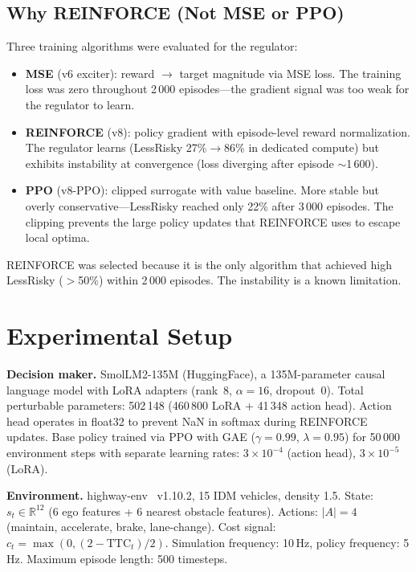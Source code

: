 \documentclass[runningheads]{llncs}
\begin{document}
\subsection{Why REINFORCE (Not MSE or PPO)}

Three training algorithms were evaluated for the regulator:
\begin{itemize}
\item \textbf{MSE} (v6 exciter): reward $\to$ target magnitude via MSE loss. The training loss was zero throughout 2\,000 episodes---the gradient signal was too weak for the regulator to learn.
\item \textbf{REINFORCE} (v8): policy gradient with episode-level reward normalization. The regulator learns (LessRisky 27\%$\to$86\% in dedicated compute) but exhibits instability at convergence (loss diverging after episode $\sim$1\,600).
\item \textbf{PPO} (v8-PPO): clipped surrogate with value baseline. More stable but overly conservative---LessRisky reached only 22\% after 3\,000 episodes. The clipping prevents the large policy updates that REINFORCE uses to escape local optima.
\end{itemize}

REINFORCE was selected because it is the only algorithm that achieved high LessRisky ($>$50\%) within 2\,000 episodes. The instability is a known limitation.

\FloatBarrier
\section{Experimental Setup}
\label{sec:setup}

\textbf{Decision maker.} SmolLM2-135M (HuggingFace), a 135M-parameter causal language model with LoRA adapters (rank~8, $\alpha{=}16$, dropout~0). Total perturbable parameters: 502\,148 (460\,800 LoRA + 41\,348 action head). Action head operates in float32 to prevent NaN in softmax during REINFORCE updates. Base policy trained via PPO with GAE ($\gamma{=}0.99$, $\lambda{=}0.95$) for 50\,000 environment steps with separate learning rates: $3{\times}10^{-4}$ (action head), $3{\times}10^{-5}$ (LoRA).

\textbf{Environment.} highway-env~\cite{leurent2018highway} v1.10.2, 15 IDM vehicles, density 1.5. State: $s_t \in \mathbb{R}^{12}$ (6 ego features + 6 nearest obstacle features). Actions: $|A|{=}4$ (maintain, accelerate, brake, lane-change). Cost signal: $c_t = \max(0, (2-\text{TTC}_t)/2)$. Simulation frequency: 10\,Hz, policy frequency: 5\,Hz. Maximum episode length: 500 timesteps.
\end{document}
